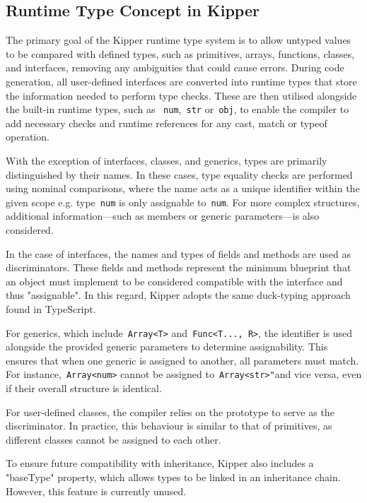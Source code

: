 \subsection{Runtime Type Concept in Kipper}

The primary goal of the Kipper runtime type system is to allow untyped values to be compared with defined types, such as primitives, arrays, functions, classes, and interfaces, removing any ambiguities that could cause errors. During code generation, all user-defined interfaces are converted into runtime types that store the information needed to perform type checks. These are then utilised alongside the built-in runtime types, such as ~\lstinline|num|,~\lstinline|str| or~\lstinline|obj|, to enable the compiler to add necessary checks and runtime references for any cast, match or typeof operation.

With the exception of interfaces, classes, and generics, types are primarily distinguished by their names. In these cases, type equality checks are performed using nominal comparisons, where the name acts as a unique identifier within the given scope e.g. type~\lstinline|num| is only assignable to~\lstinline|num|. For more complex structures, additional information—such as members or generic parameters—is also considered.

In the case of interfaces, the names and types of fields and methods are used as discriminators. These fields and methods represent the minimum blueprint that an object must implement to be considered compatible with the interface and thus "assignable". In this regard, Kipper adopts the same duck-typing approach found in TypeScript.

For generics, which include~\lstinline|Array<T>| and~\lstinline|Func<T..., R>|, the identifier is used alongside the provided generic parameters to determine assignability. This ensures that when one generic is assigned to another, all parameters must match. For instance,~\lstinline|Array<num>| cannot be assigned to~\lstinline|Array<str>"|and vice versa, even if their overall structure is identical.

For user-defined classes, the compiler relies on the prototype to serve as the discriminator. In practice, this behaviour is similar to that of primitives, as different classes cannot be assigned to each other.

To ensure future compatibility with inheritance, Kipper also includes a "baseType" property, which allows types to be linked in an inheritance chain. However, this feature is currently unused.

